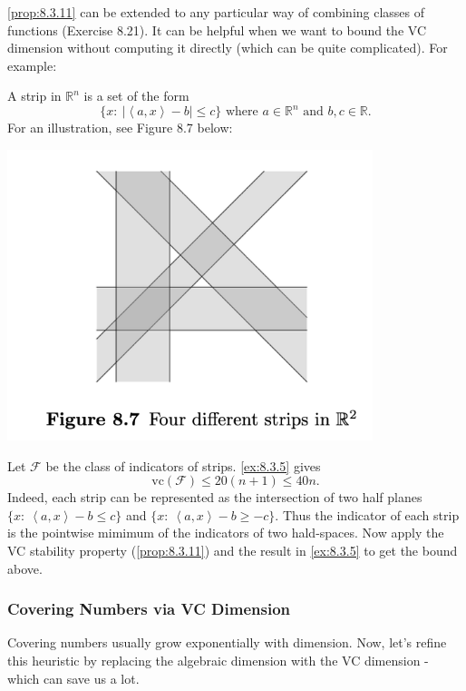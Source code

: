 \cref{prop:8.3.11} can be extended to any particular way of combining classes of functions (Exercise 8.21). It 
can be helpful when we want to bound the VC dimension without computing it directly (which can be quite 
complicated). For example:

\begin{example}[Strips]
\label{ex:8.3.12}
A strip in $\mathbb{R}^n$ is a set of the form 
\[ \{ x: \ |\left\langle a, x \right\rangle - b| \leq c \} \text{ where } a \in \mathbb{R}^n \text{ and } 
b, c \in \mathbb{R}. \]
For an illustration, see Figure 8.7 below: 
\begin{center}
    \includegraphics[width=0.8\textwidth]{Chapter 8/fig8-7.png}
\end{center}

Let $\mathcal{F}$ be the class of indicators of strips. \cref{ex:8.3.5} gives 
\[ \mathrm{vc}(\mathcal{F}) \leq 20(n + 1) \leq 40n. \]
Indeed, each strip can be represented as the intersection of two half planes $\{ x: \ \left\langle a, x
\right\rangle - b \leq c \}$ and $\{ x: \ \left\langle a, x \right\rangle - b \geq -c \}$. Thus the indicator of 
each strip is the pointwise mimimum of the indicators of two hald-spaces. Now apply the VC stability property 
(\cref{prop:8.3.11}) and the result in \cref{ex:8.3.5} to get the bound above. 
\end{example}


\subsubsection{Covering Numbers via VC Dimension}
Covering numbers usually grow exponentially with dimension. Now, let's refine this heuristic by replacing the 
algebraic dimension with the VC dimension - which can save us a lot.


